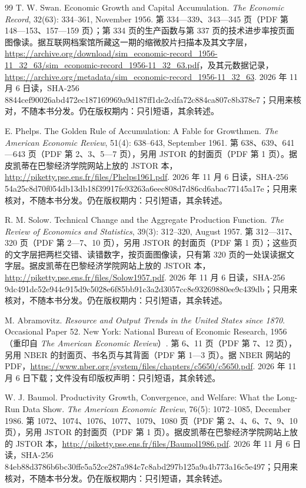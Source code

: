 \begin{thebibliography}{99}
 T. W. Swan. Economic Growth and Capital Accumulation. \emph{The Economic Record}, 32(63): 334--361, November 1956. 第 334—339、343—345 页（PDF 第 148—153、157—159 页）；第 334 页的生产函数与第 337 页的技术进步率按页面图像读。据互联网档案馆所藏这一期的缩微胶片扫描本及其文字层，\url{https://archive.org/download/sim_economic-record_1956-11_32_63/sim_economic-record_1956-11_32_63.pdf}，及其元数据记录，\url{https://archive.org/metadata/sim_economic-record_1956-11_32_63}. 2026 年 11 月 6 日读，SHA-256 8844cef90026abd472ec187169969a9d187ff1de2cdfa72c884ca807c8b378e7；只用来核对，不随本书分发。仍在版权期内：只引短语，其余转述。

 E. Phelps. The Golden Rule of Accumulation: A Fable for Growthmen. \emph{The American Economic Review}, 51(4): 638--643, September 1961. 第 638、639、641—643 页（PDF 第 2、3、5—7 页），另用 JSTOR 的封面页（PDF 第 1 页）。据皮凯蒂在巴黎经济学院网站上放的 JSTOR 本，\url{http://piketty.pse.ens.fr/files/Phelps1961.pdf}. 2026 年 11 月 6 日读，SHA-256 54a25c8d70f054db13db18f39917fe93263a6eec808d7d86cd6abac77145a17e；只用来核对，不随本书分发。仍在版权期内：只引短语，其余转述。

 R. M. Solow. Technical Change and the Aggregate Production Function. \emph{The Review of Economics and Statistics}, 39(3): 312--320, August 1957. 第 312—317、320 页（PDF 第 2—7、10 页），另用 JSTOR 的封面页（PDF 第 1 页）；这些页的文字层把两栏交错、读错数字，按页面图像读，只有第 320 页的一处误读据文字层。据皮凯蒂在巴黎经济学院网站上放的 JSTOR 本，\url{http://piketty.pse.ens.fr/files/Solow1957.pdf}. 2026 年 11 月 6 日读，SHA-256 9dc491dc52e944c915d9c5028e6f85bb91c3a2d3057cc8e93269880ee9c439db；只用来核对，不随本书分发。仍在版权期内：只引短语，其余转述。

 M. Abramovitz. \emph{Resource and Output Trends in the United States since 1870}. Occasional Paper 52. New York: National Bureau of Economic Research, 1956（重印自 \emph{The American Economic Review}）. 第 6、11 页（PDF 第 7、12 页），另用 NBER 的封面页、书名页与其背面（PDF 第 1—3 页）。据 NBER 网站的 PDF，\url{https://www.nber.org/system/files/chapters/c5650/c5650.pdf}. 2026 年 11 月 6 日下载；文件没有印版权声明：只引短语，其余转述。

 W. J. Baumol. Productivity Growth, Convergence, and Welfare: What the Long-Run Data Show. \emph{The American Economic Review}, 76(5): 1072--1085, December 1986. 第 1072、1074、1076、1077、1079、1080 页（PDF 第 2、4、6、7、9、10 页），另用 JSTOR 的封面页（PDF 第 1 页）。据皮凯蒂在巴黎经济学院网站上放的 JSTOR 本，\url{http://piketty.pse.ens.fr/files/Baumol1986.pdf}. 2026 年 11 月 6 日读，SHA-256 84eb88d3786b6bc30ffe5a52ce287a984c7c8abd297b125a9a4b773a16c5e497；只用来核对，不随本书分发。仍在版权期内：只引短语，其余转述。


\end{thebibliography}
